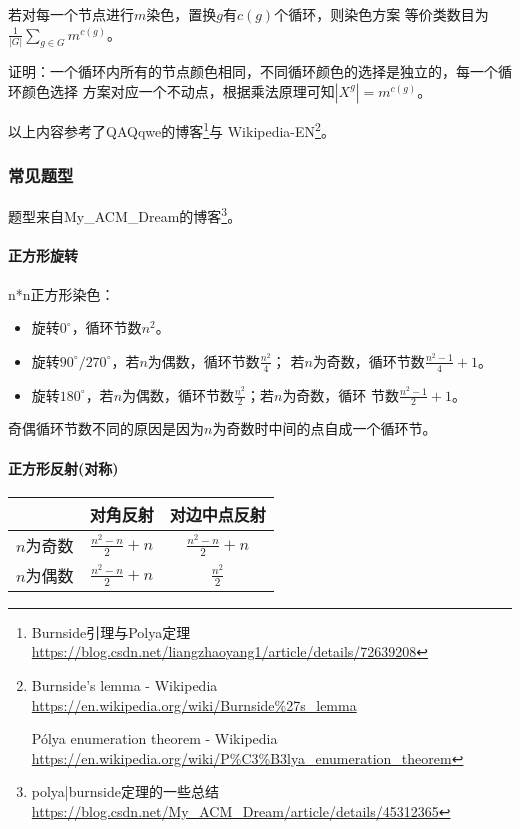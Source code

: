 \begin{theorem}
	若对每一个节点进行$m$染色，置换$g$有$c(g)$个循环，则染色方案
	等价类数目为$\displaystyle \frac{1}{|G|}\sum_{g\in G}m^{c(g)}$。
\end{theorem}

证明：一个循环内所有的节点颜色相同，不同循环颜色的选择是独立的，每一个循环颜色选择
方案对应一个不动点，根据乘法原理可知$|X^g|=m^{c(g)}$。

以上内容参考了QAQqwe的博客\footnote{Burnside引理与Polya定理
	\url{https://blog.csdn.net/liangzhaoyang1/article/details/72639208}}与
Wikipedia-EN\footnote{
	Burnside's lemma - Wikipedia
	\url{https://en.wikipedia.org/wiki/Burnside\%27s\_lemma}

	Pólya enumeration theorem - Wikipedia
	\url{https://en.wikipedia.org/wiki/P\%C3\%B3lya\_enumeration\_theorem}
}。

\subsubsection{常见题型}
题型来自My\_ACM\_Dream的博客\footnote{polya|burnside定理的一些总结\\
	\url{https://blog.csdn.net/My\_ACM\_Dream/article/details/45312365}}。

\paragraph{正方形旋转}
n*n正方形染色：
\begin{itemize}
	\item 旋转$0^\circ$，循环节数$n^2$。
	\item 旋转$90^\circ/270^\circ$，若$n$为偶数，循环节数$\frac{n^2}{4}$；
	      若$n$为奇数，循环节数$\frac{n^2-1}{4}+1$。
	\item 旋转$180^\circ$，若$n$为偶数，循环节数$\frac{n^2}{2}$；若$n$为奇数，循环
	      节数$\frac{n^2-1}{2}+1$。
\end{itemize}
奇偶循环节数不同的原因是因为$n$为奇数时中间的点自成一个循环节。
\paragraph{正方形反射(对称)}
\begin{tabular}{|c|c|c|}
	\hline
	          & 对角反射            & 对边中点反射        \\
	\hline
	$n$为奇数 & $\frac{n^2-n}{2}+n$ & $\frac{n^2-n}{2}+n$ \\
	\hline
	$n$为偶数 & $\frac{n^2-n}{2}+n$ & $\frac{n^2}{2}$     \\
	\hline
\end{tabular}
